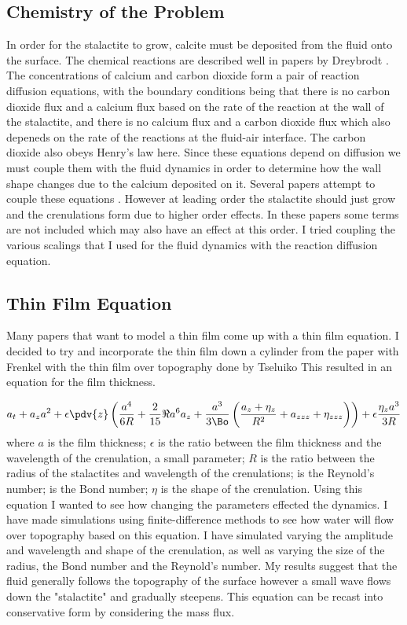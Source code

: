 \documentclass[12pt]{article}
\begin{document}
\subsection{Chemistry of the Problem}
In order for the stalactite to grow, calcite must be deposited from the fluid onto the surface. The chemical reactions are described well in papers by Dreybrodt \cite{formation}. The concentrations of calcium and carbon dioxide form a pair of  reaction diffusion equations, with the boundary conditions being that there is no carbon dioxide flux and a calcium flux based on the rate of the reaction at the wall of the stalactite, and there is no calcium flux and a carbon dioxide flux which also depeneds on the rate of the reactions at the fluid-air interface.  The carbon dioxide also obeys Henry's law here. Since these equations depend on diffusion we must couple them with the fluid dynamics in order to determine how the wall shape changes due to the calcium deposited on it.
Several papers attempt to couple these equations \cite{short,camporeale_2017}. However at leading order the stalactite should just grow and the crenulations form due to higher order effects. In these papers some terms are not included which may also have an effect at this order. I tried coupling the various scalings that I used for the fluid dynamics with the reaction diffusion equation.




\subsection{Thin Film Equation}
Many papers that want to model a thin film come up with a thin film equation. I decided to try and incorporate the thin film down a cylinder from the paper with Frenkel \cite{Frenkel_1992} with the thin film over topography done by Tseluiko \cite{tseluiko_blyth_papageorgiou_2013}
This resulted in an equation for the film thickness.

\begin{align}
a_t + a_z a^2  +\epsilon\pdv{z}\left(\frac{a^4}{6R}+\frac{2}{15}\Re a^6a_z+ \frac{a^3}{3\Bo}\left(\frac{a_z+\eta_z}{R^2}+a_{zzz}+\eta_{zzz}\right)\right) + \epsilon\frac{\eta_z a^3}{3R}\label{walldyn}
\end{align}
where $a$ is the film thickness; $\epsilon$ is the ratio between the film thickness and the wavelength of the crenulation, a small parameter; $R$ is the ratio between the radius of the stalactites and wavelength of the crenulations; is the Reynold's number;  is the Bond number; $\eta$ is the shape of the crenulation.
Using this equation I wanted to see how changing the parameters effected the dynamics. I have made simulations using finite-difference methods to see how water will flow over topography based on this equation. I have simulated varying the amplitude and wavelength and shape of the crenulation, as well as varying the size of the radius, the Bond number and the Reynold's number. My results suggest that the fluid generally follows the topography of the surface however a small wave flows down the "stalactite" and gradually steepens. This equation can be recast into conservative form by considering the mass flux. 
\end{document}
